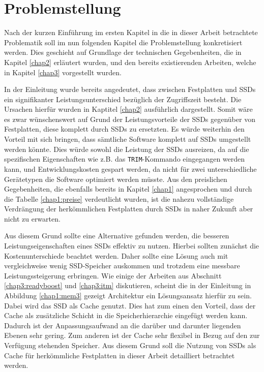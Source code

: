 \chapter{Problemstellung}
\label{chap4}

Nach der kurzen Einführung im ersten Kapitel in die in dieser Arbeit betrachtete Problematik soll im nun folgenden Kapitel die Problemstellung konkretisiert
werden. Dies geschieht auf Grundlage der technischen Gegebenheiten, die in Kapitel \ref{chap2} erläutert wurden, und den bereits existierenden Arbeiten, welche
in Kapitel \ref{chap3} vorgestellt wurden.

In der Einleitung wurde bereits angedeutet, dass zwischen Festplatten und \acp{SSD} ein signifikanter Leistungsunterschied bezüglich der Zugriffszeit besteht.
Die Ursachen hierfür wurden in Kaptitel \ref{chap2} ausführlich dargestellt. Somit wäre es
zwar wünschenswert auf Grund der Leistungsvorteile der \acp{SSD} gegenüber von Festplatten, diese komplett durch \acp{SSD} zu ersetzten. Es würde weiterhin
den Vorteil mit sich bringen, dass sämtliche Software komplett auf \acp{SSD} umgestellt werden könnte. Dies würde sowohl die Leistung der \acp{SSD} ausreizen, da auf
die spezifischen Eigenschaften wie z.B. das \texttt{TRIM}-Kommando eingegangen werden kann, und Entwicklungskosten gespart werden, da nicht für zwei
unterschiedliche Gerätetypen die Software optimiert werden müsste. Aus den preislichen Gegebenheiten, die ebenfalls bereits in Kapitel \ref{chap1} angesprochen und durch die
Tabelle \ref{chap1:preise} verdeutlicht wurden, ist die nahezu vollständige Verdrängung der herkömmlichen Festplatten durch \acp{SSD} in naher Zukunft aber
nicht zu erwarten.

Aus diesem Grund sollte eine Alternative gefunden werden, die besseren Leistungseigenschaften eines \ac{SSD}s effektiv zu nutzen. Hierbei sollten zunächst die
Kostenunterschiede beachtet werden. Daher sollte eine Lösung auch mit vergleichweise wenig \ac{SSD}-Speicher auskommen und trotzdem eine messbare
Leistungssteigerung erbringen. Wie einige der Arbeiten aus Abschnitt \ref{chap3:readyboost} und \ref{chap3:itm} diskutieren, scheint die in der Einleitung in
Abbildung \ref{chap1:mem3} gezeigt Architektur ein Lösungsansatz hierfür zu sein. Dabei wird das \ac{SSD} als Cache genutzt. Dies hat zum einen den Vorteil, dass
der Cache als zusätzliche Schicht in die Speicherhierarchie eingefügt werden kann. Dadurch ist der Anpassungsaufwand an die darüber und darunter liegenden Ebenen
sehr gering. Zum anderen ist der Cache sehr flexibel in Bezug auf den zur Verfügung stehenden Speicher. Aus diesem Grund soll die Nutzung von \acp{SSD} als Cache
für herkömmliche Festplatten in dieser Arbeit detailliert betrachtet werden.

